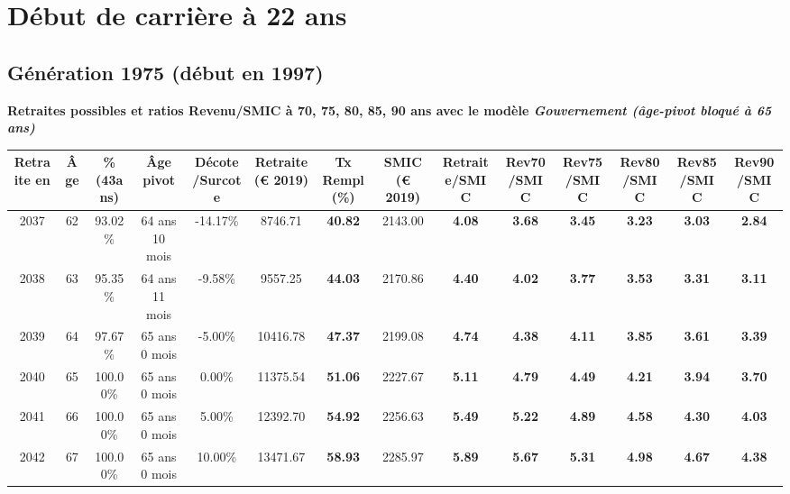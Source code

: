  \addto{\captionsenglish}{ \renewcommand{\mtctitle}{}} \setcounter{minitocdepth}{2} 
 \minitoc \newpage 

\section{Début de carrière à 22 ans} 

\subsection{Génération 1975 (début en 1997)} 

{\bf \noindent Retraites possibles et ratios Revenu/SMIC à 70, 75, 80, 85, 90 ans avec le modèle \emph{Gouvernement (âge-pivot bloqué à 65 ans)}}  
 
\begin{adjustbox}{max width=\textwidth} 
\begin{tabular}[htb]{|c|c||c|c|c||c|c||c||c|c|c|c|c|c|} 
\hline 
 Retraite en &  Âge &  \%(43ans) &  Âge pivot &  Décote/Surcote &  Retraite (\euro{} 2019) &  Tx Rempl(\%) &  SMIC (\euro{} 2019) &  Retraite/SMIC &  Rev70/SMIC &  Rev75/SMIC &  Rev80/SMIC &  Rev85/SMIC &  Rev90/SMIC \\ 
\hline \hline 
 2037 &  62 &  93.02\% &  64 ans 10 mois &  -14.17\% &  8746.71 &  {\bf 40.82} &  2143.00 &  {\bf 4.08} &  {\bf 3.68} &  {\bf 3.45} &  {\bf 3.23} &  {\bf 3.03} &  {\bf 2.84} \\ 
\hline 
 2038 &  63 &  95.35\% &  64 ans 11 mois &  -9.58\% &  9557.25 &  {\bf 44.03} &  2170.86 &  {\bf 4.40} &  {\bf 4.02} &  {\bf 3.77} &  {\bf 3.53} &  {\bf 3.31} &  {\bf 3.11} \\ 
\hline 
 2039 &  64 &  97.67\% &  65 ans 0 mois &  -5.00\% &  10416.78 &  {\bf 47.37} &  2199.08 &  {\bf 4.74} &  {\bf 4.38} &  {\bf 4.11} &  {\bf 3.85} &  {\bf 3.61} &  {\bf 3.39} \\ 
\hline 
 2040 &  65 &  100.00\% &  65 ans 0 mois &  0.00\% &  11375.54 &  {\bf 51.06} &  2227.67 &  {\bf 5.11} &  {\bf 4.79} &  {\bf 4.49} &  {\bf 4.21} &  {\bf 3.94} &  {\bf 3.70} \\ 
\hline 
 2041 &  66 &  100.00\% &  65 ans 0 mois &  5.00\% &  12392.70 &  {\bf 54.92} &  2256.63 &  {\bf 5.49} &  {\bf 5.22} &  {\bf 4.89} &  {\bf 4.58} &  {\bf 4.30} &  {\bf 4.03} \\ 
\hline 
 2042 &  67 &  100.00\% &  65 ans 0 mois &  10.00\% &  13471.67 &  {\bf 58.93} &  2285.97 &  {\bf 5.89} &  {\bf 5.67} &  {\bf 5.31} &  {\bf 4.98} &  {\bf 4.67} &  {\bf 4.38} \\ 
\hline 
\hline 
\end{tabular} 
\end{adjustbox} 
 
